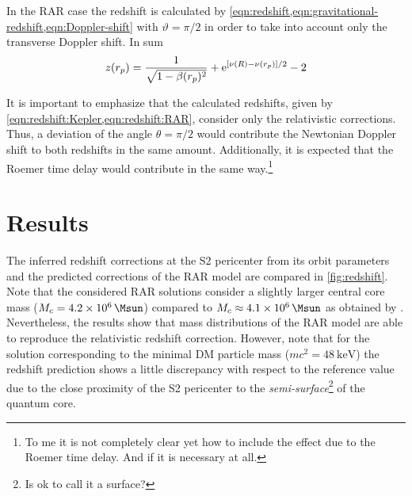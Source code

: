 \documentclass[nofootinbib,tightenlines,nobibnotes,aps,prl,preprint,superscriptaddress]{revtex4-1}
\begin{document}
In the RAR case the redshift is calculated by \cref{eqn:redshift,eqn:gravitational-redshift,eqn:Doppler-shift} with $\vartheta = \pi/2$ in order to take into account only the transverse Doppler shift. In sum \begin{equation}
	\label{eqn:redshift:RAR}
	z(r_p) = \frac{1}{\sqrt{1 - \beta(r_p)^2}} + \mathrm{e}^{[\nu(R) - \nu(r_p)]/2} - 2
\end{equation}

It is important to emphasize that the calculated redshifts, given by \cref{eqn:redshift:Kepler,eqn:redshift:RAR}, consider only the relativistic corrections. Thus, a deviation of the angle $\theta=\pi/2$ would contribute the Newtonian Doppler shift to both redshifts in the same amount. Additionally, it is expected that the Roemer time delay would contribute in the same way.\footnote{To me it is not completely clear yet how to include the effect due to the Roemer time delay. And if it is necessary at all.}


\section{Results}
The inferred redshift corrections at the S2 pericenter from its orbit parameters and the predicted corrections of the RAR model are compared in \cref{fig:redshift}. Note that the considered RAR solutions consider a slightly larger central core mass ($M_c = \SI{4.2E6}{\Msun}$) compared to $M_c \approx \SI{4.1E6}{\Msun}$ as obtained by \citet{2018A&A...615L..15G}. Nevertheless, the results show that mass distributions of the RAR model are able to reproduce the relativistic redshift correction. However, note that for the solution corresponding to the minimal DM particle mass ($mc^2 = \SI{48}{\kilo\eV}$) the redshift prediction shows a little discrepancy with respect to the reference value due to the close proximity of the S2 pericenter to the \textit{semi-surface}\footnote{Is ok to call it a surface?} of the quantum core.




\end{document}
